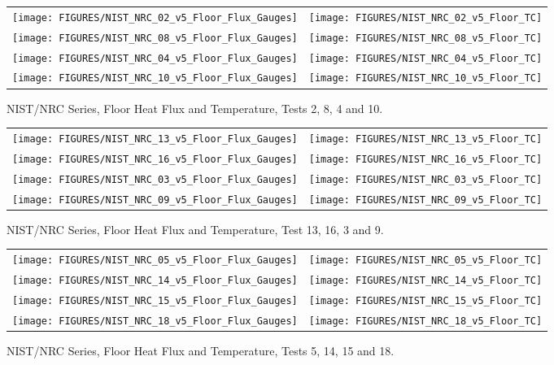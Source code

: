 \begin{figure}[p]
\begin{tabular*}{\textwidth}{l@{\extracolsep{\fill}}r}
\texttt{[image: FIGURES/NIST\_NRC\_02\_v5\_Floor\_Flux\_Gauges]} &
\texttt{[image: FIGURES/NIST\_NRC\_02\_v5\_Floor\_TC]} \\
\texttt{[image: FIGURES/NIST\_NRC\_08\_v5\_Floor\_Flux\_Gauges]} &
\texttt{[image: FIGURES/NIST\_NRC\_08\_v5\_Floor\_TC]} \\
\texttt{[image: FIGURES/NIST\_NRC\_04\_v5\_Floor\_Flux\_Gauges]} &
\texttt{[image: FIGURES/NIST\_NRC\_04\_v5\_Floor\_TC]} \\
\texttt{[image: FIGURES/NIST\_NRC\_10\_v5\_Floor\_Flux\_Gauges]} &
\texttt{[image: FIGURES/NIST\_NRC\_10\_v5\_Floor\_TC]}

\end{tabular*}
\caption{NIST/NRC Series, Floor Heat Flux and Temperature, Tests 2, 8, 4 and 10.}
\label{NIST_NRC_Floor_2}
\end{figure}

\begin{figure}[p]
\begin{tabular*}{\textwidth}{l@{\extracolsep{\fill}}r}
\texttt{[image: FIGURES/NIST\_NRC\_13\_v5\_Floor\_Flux\_Gauges]} &
\texttt{[image: FIGURES/NIST\_NRC\_13\_v5\_Floor\_TC]} \\
\texttt{[image: FIGURES/NIST\_NRC\_16\_v5\_Floor\_Flux\_Gauges]} &
\texttt{[image: FIGURES/NIST\_NRC\_16\_v5\_Floor\_TC]} \\
\texttt{[image: FIGURES/NIST\_NRC\_03\_v5\_Floor\_Flux\_Gauges]} &
\texttt{[image: FIGURES/NIST\_NRC\_03\_v5\_Floor\_TC]} \\
\texttt{[image: FIGURES/NIST\_NRC\_09\_v5\_Floor\_Flux\_Gauges]} &
\texttt{[image: FIGURES/NIST\_NRC\_09\_v5\_Floor\_TC]}

\end{tabular*}
\caption{NIST/NRC Series, Floor Heat Flux and Temperature, Test 13, 16, 3 and 9.}
\label{NIST_NRC_Floor_3}
\end{figure}

\begin{figure}[p]
\begin{tabular*}{\textwidth}{l@{\extracolsep{\fill}}r}
\texttt{[image: FIGURES/NIST\_NRC\_05\_v5\_Floor\_Flux\_Gauges]} &
\texttt{[image: FIGURES/NIST\_NRC\_05\_v5\_Floor\_TC]} \\
\texttt{[image: FIGURES/NIST\_NRC\_14\_v5\_Floor\_Flux\_Gauges]} &
\texttt{[image: FIGURES/NIST\_NRC\_14\_v5\_Floor\_TC]} \\
\texttt{[image: FIGURES/NIST\_NRC\_15\_v5\_Floor\_Flux\_Gauges]} &
\texttt{[image: FIGURES/NIST\_NRC\_15\_v5\_Floor\_TC]} \\
\texttt{[image: FIGURES/NIST\_NRC\_18\_v5\_Floor\_Flux\_Gauges]} &
\texttt{[image: FIGURES/NIST\_NRC\_18\_v5\_Floor\_TC]}
\end{tabular*}
\caption{NIST/NRC Series, Floor Heat Flux and Temperature, Tests 5, 14, 15 and 18.}
\label{NIST_NRC_Floor_4}
\end{figure}

\clearpage
